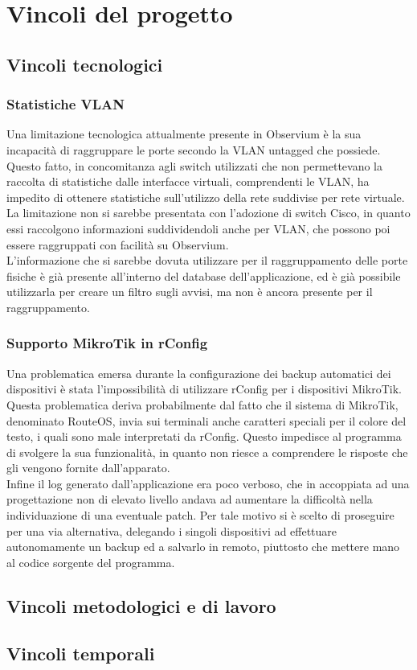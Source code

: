\documentclass[Tesi.tex]{subfiles}
\begin{document}
\section{Vincoli del progetto}
\subsection{Vincoli tecnologici}
\subsubsection{Statistiche VLAN}
Una limitazione tecnologica attualmente presente in Observium è la sua incapacità di raggruppare le porte secondo la VLAN untagged che possiede. \\
Questo fatto, in concomitanza agli switch utilizzati che non permettevano la raccolta di statistiche dalle interfacce virtuali, comprendenti le VLAN, ha impedito di ottenere statistiche sull'utilizzo della rete suddivise per rete virtuale. \\
La limitazione non si sarebbe presentata con l'adozione di switch Cisco, in quanto essi raccolgono informazioni suddividendoli anche per VLAN, che possono poi essere raggruppati con facilità su Observium. \\
L'informazione che si sarebbe dovuta utilizzare per il raggruppamento delle porte fisiche è già presente all'interno del database dell'applicazione, ed è già possibile utilizzarla per creare un filtro sugli avvisi, ma non è ancora presente per il raggruppamento.

\subsubsection{Supporto MikroTik in rConfig}
Una problematica emersa durante la configurazione dei backup automatici dei dispositivi è stata l'impossibilità di utilizzare rConfig per i dispositivi MikroTik. \\
Questa problematica deriva probabilmente dal fatto che il sistema di MikroTik, denominato RouteOS, invia sui terminali anche caratteri speciali per il colore del testo, i quali sono male interpretati da rConfig. Questo impedisce al programma di svolgere la sua funzionalità, in quanto non riesce a comprendere le risposte che gli vengono fornite dall'apparato. \\
Infine il log generato dall'applicazione era poco verboso, che in accoppiata ad una progettazione non di elevato livello andava ad aumentare la difficoltà nella individuazione di una eventuale patch. Per tale motivo si è scelto di proseguire per una via alternativa, delegando i singoli dispositivi ad effettuare autonomamente un backup ed a salvarlo in remoto, piuttosto che mettere mano al codice sorgente del programma.

\subsection{Vincoli metodologici e di lavoro}

\subsection{Vincoli temporali}
\end{document}
